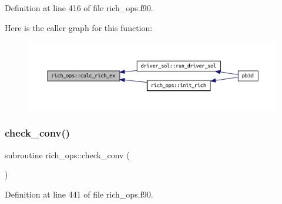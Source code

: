 Definition at line 416 of file rich\+\_\+ops.\+f90.

Here is the caller graph for this function\+:
\nopagebreak
\begin{figure}[H]
\begin{center}
\leavevmode
\includegraphics[width=350pt]{namespacerich__ops_ad2717df0206a397d0d7845a96aa5da23_icgraph}
\end{center}
\end{figure}
\mbox{\label{namespacerich__ops_ac00cce686d45540b238b3b6e39c9bdeb}} 
\subsubsection{\texorpdfstring{check\+\_\+conv()}{check\_conv()}}
{\footnotesize\ttfamily subroutine rich\+\_\+ops\+::check\+\_\+conv (\begin{DoxyParamCaption}{ }\end{DoxyParamCaption})}



Definition at line 441 of file rich\+\_\+ops.\+f90.

